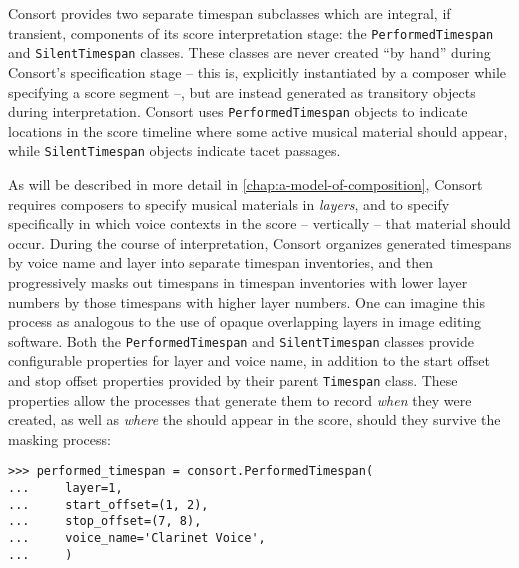 Consort provides two separate timespan subclasses which are integral, if
transient, components of its score interpretation stage: the
\texttt{PerformedTimespan} and \texttt{SilentTimespan} classes. These classes
are never created \enquote{by hand} during Consort's specification stage --
this is, explicitly instantiated by a composer while specifying a score segment
--, but are instead generated as transitory objects during interpretation.
Consort uses \texttt{PerformedTimespan} objects to indicate locations in the
score timeline where some active musical material should appear, while
\texttt{SilentTimespan} objects indicate tacet passages.

As will be described in more detail in \autoref{chap:a-model-of-composition},
Consort requires composers to specify musical materials in \emph{layers}, and
to specify specifically in which voice contexts in the score -- vertically --
that material should occur. During the course of interpretation, Consort
organizes generated timespans by voice name and layer into separate timespan
inventories, and then progressively masks out timespans in timespan inventories
with lower layer numbers by those timespans with higher layer numbers. One can
imagine this process as analogous to the use of opaque overlapping layers in
image editing software. Both the \texttt{PerformedTimespan} and
\texttt{SilentTimespan} classes provide configurable properties for layer and
voice name, in addition to the start offset and stop offset properties provided
by their parent \texttt{Timespan} class. These properties allow the processes
that generate them to record \emph{when} they were created, as well as
\emph{where} the should appear in the score, should they survive the masking
process:

\begin{comment}
<abjad>
performed_timespan = consort.PerformedTimespan(
    layer=1,
    start_offset=(1, 2),
    stop_offset=(7, 8),
    voice_name='Clarinet Voice',
    )
</abjad>
\end{comment}

\begin{abjadbookoutput}
\begin{singlespacing}
\vspace{-0.5\baselineskip}
\begin{lstlisting}
>>> performed_timespan = consort.PerformedTimespan(
...     layer=1,
...     start_offset=(1, 2),
...     stop_offset=(7, 8),
...     voice_name='Clarinet Voice',
...     )
\end{lstlisting}
\end{singlespacing}
\end{abjadbookoutput}

